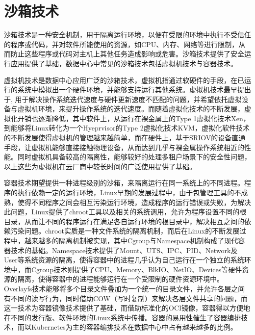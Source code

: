 \section{沙箱技术}


沙箱技术是一种安全机制，用于隔离运行环境，以便在受限的环境中执行不受信任的程序或代码，并对软件所能使用的资源，如CPU、内存、网络等进行限制，从而防止这些程序或代码对主机上其他任务造成影响或危害。沙箱技术提供了安全运行应用提供了基础，数据中心中常见的沙箱技术包括虚拟机技术与容器技术。

虚拟机技术是数据中心应用广泛的沙箱技术，虚拟机指通过软硬件的手段，在已运行的系统中模拟出一个硬件环境，并能够支持运行其他系统。虚拟机技术最早提出于\citep{bugnion1997disco}, 用于解决操作系统迭代速度与硬件更新速度不匹配的问题，并希望依托虚拟设备与虚拟机环境，来提升操作系统的迭代速度。而随着虚拟化技术的不断发展，虚拟化开销也逐渐降低，其中软件上，从运行在裸金属上的Type 1虚拟化技术Xen\citep{barham2003xen}，到能够将Linux转化为一个Hyeprvisor的Type 2虚拟化技术KVM\citep{kivity2007kvm}，虚拟化软件技术的不断发展使得虚拟机的管理越来越简单，而在硬件上，基于SRIOV的设备直通手段\citep{dong2012high}，让虚拟机能够直接接触物理设备，从而达到几乎与裸金属操作系统相近的性能。同时虚拟机具备较高的隔离性，能够较好的处理多租户场景下的安全性问题，以上这些为虚拟机在云厂商中较长时间的广泛使用提供了基础。

容器技术期望提供一种进程级别的沙箱，来隔离运行在同一系统上的不同进程。程序的执行依赖一定的运行环境，Linux早期的发展过程中，由于包管理工具的不成熟，使得不同程序之间会相互污染运行环境，造成程序的运行错误或失败，为解决此问题，Linux提供了chroot工具以及相关的系统调用，允许为程序设置不同的根目录，从而让不同的程序运行在满足各自运行环境的根目录中，解决相互之间的依赖污染问题。chroot实质是一种文件系统的隔离机制，而后在Linux的不断发展过程中，越来越多的隔离机制被实现，其中Cgroup与Namespace机制构成了现代容器技术的基础。Namespace技术提供了Mount、UTS、IPC、PID、Network及User等系统资源的隔离，使得容器中的进程几乎认为自己运行在一个独立的系统环境中，而Cgroup技术则提供了CPU、Memory、BlkIO、NetIO、Devices等硬件资源的隔离，使得容器中的进程能够运行在一个受限制的硬件资源环境中。Overlayfs技术能够将多个目录文件叠加为一个统一的目录文件，并允许各层之间有不同的读写行为，同时借助COW（写时复制）来解决各层文件共享的问题，而这一技术为容器镜像技术提供了基础，而借助标准化的OCI镜像，容器得以方便地在不同的发行版、软件环境的Linux系统中传播。容器的易用性催生了容器编排技术，而以Kubernetes为主的容器编排技术在数据中心中占有越来越多的比例。

